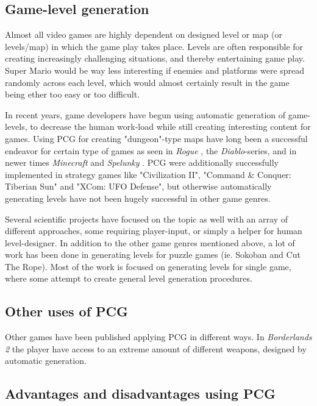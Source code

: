 \documentclass[a4paper,titlepage,final, twoside]{report}
\begin{document}
\subsection{Game-level generation}
Almost all video games are highly dependent on designed level or map (or levels/map) in which the game play takes place. Levels are often responsible for creating increasingly challenging situations, and thereby entertaining game play. Super Mario would be way less interesting if enemies and platforms were spread randomly across each level, which would almost certainly result in the game being ether too easy or too difficult.

In recent years, game developers have begun using automatic generation of game-levels, to decrease the human work-load while still creating interesting content for games. Using PCG for creating "dungeon"-type maps have long been a successful endeavor for certain type of games as seen in \textit{Rogue} \citeyearpar{game:rogue}, the \textit{Diablo}-series, and in newer times \textit{Minecraft} \citeyearpar{game:minecraft} and \textit{Spelunky} \citeyearpar{game:spelunky}. PCG were additionally successfully implemented in strategy games like "Civilization II", "Command \& Conquer: Tiberian Sun" and "XCom: UFO Defense", but otherwise automatically generating levels have not been hugely successful in other game genres.

Several scientific projects have focused on the topic as well with an array of different approaches, some requiring player-input, or simply a helper for human level-designer. In addition to the other game genres mentioned above, a lot of work has been done in generating levels for puzzle games (ie. Sokoban and Cut The Rope).
Most of the work is focused on generating levels for single game, where some attempt to create general level generation procedures.


\subsection{Other uses of PCG}
Other games have been published applying PCG in different ways. In \textit{Borderlands 2} \citeyearpar{game:borderlands} the player have access to an extreme amount of different weapons, designed by automatic generation.


\subsection{Advantages and disadvantages using PCG}
\end{document}
